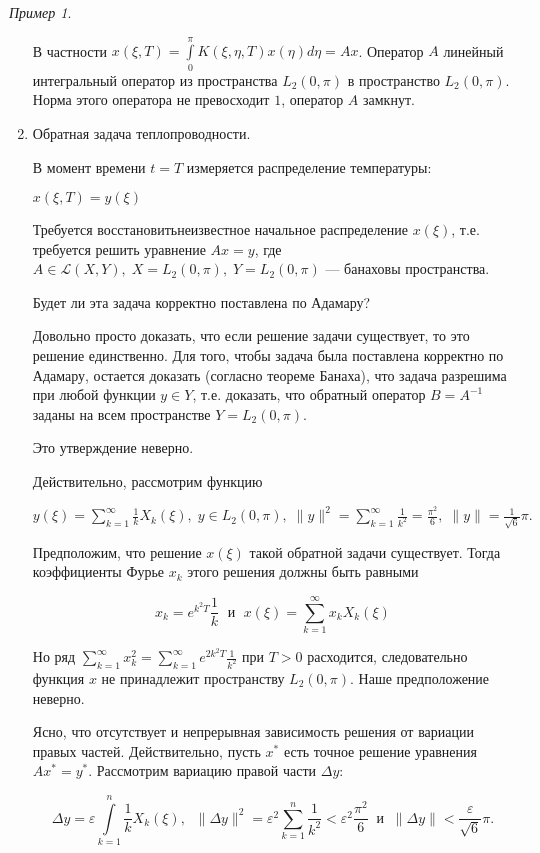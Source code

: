 \documentclass[12pt,a4paper,titlepage,oneside]{book}
\theoremstyle{definition}
\theoremstyle{plain}
\theoremstyle{break}
\theoremstyle{remark}
\theoremstyle{remark}
\newtheorem*{example}{Пример}
\theoremstyle{remark}
\theoremstyle{remark}
\theoremstyle{plain}
\theoremstyle{plain}
\begin{document}
\begin{example}
\begin{enumerate}
В частности $x(\xi,T) = \displaystyle\int\limits_0^\pi K(\xi, \eta, T) x(\eta)d\eta = Ax$. Оператор $A$ линейный интегральный оператор из пространства $L_2(0, \pi)$ в пространство $L_2(0, \pi)$. Норма этого оператора не превосходит $1$, оператор $A$ замкнут.

	\item Обратная задача теплопроводности.

В момент времени $t = T$ измеряется  распределение температуры:
\begin{center}
$x(\xi, T) = y(\xi)$
\end{center}

Требуется \guillemotleft восстановить\guillemotright \;неизвестное начальное распределение $x(\xi)$, т.е. требуется решить уравнение $Ax = y$, где $A \in \mathcal{L}(X,Y), \; X = L_{2}(0, \pi), \; Y = L_{2}(0, \pi)$ --- банаховы пространства.

Будет ли эта задача корректно поставлена по Адамару?

Довольно просто доказать, что если решение задачи существует, то это решение единственно. Для того, чтобы задача была поставлена корректно по Адамару, остается доказать (согласно теореме Банаха), что задача разрешима при любой функции $y \in Y$, т.е. доказать, что обратный оператор $B = A^{-1}$ заданы на всем пространстве $Y = L_{2}(0, \pi)$.

Это утверждение неверно.

Действительно, рассмотрим функцию
\begin{center}
$y(\xi)=\displaystyle\sum\limits_{k=1}^{\infty} \frac{1}{k} X_k(\xi) ,  \; y\in L_{2}(0, \pi), \; \|y\|^2 = \sum\limits_{k=1}^{\infty} \frac{1}{k^2} = \frac{\pi^2}{6} ,  \; \|y\| = \frac{1}{\sqrt{6}}\pi \mbox{.}$
\end{center}

Предположим, что решение $x(\xi)$ такой обратной задачи существует. Тогда коэффициенты Фурье $x_k$ этого решения должны быть равными

$$x_k=e^{k^2 T} \frac{1}{k} \; \mbox{ и } \; x(\xi) = \displaystyle\sum\limits_{k=1}^{\infty} x_k X_k(\xi)$$

Но ряд $\displaystyle\sum\limits_{k=1}^{\infty} x_k^2 = \sum\limits_{k=1}^{\infty} e^{2k^2 T} \frac{1}{k^2}$ при $T > 0$ расходится, следовательно функция $x$ не принадлежит пространству $L_2(0,\pi)$. Наше предположение неверно.

Ясно, что отсутствует и непрерывная зависимость решения от вариации правых частей. Действительно, пусть $x^{*}$ есть точное решение уравнения $Ax^*=y^*$. Рассмотрим вариацию правой части  $\Delta y$:
\begin{center}
$$\Delta y = \varepsilon \int\limits_{k=1}^{n} \frac{1}{k} X_k(\xi) , \; \; \| \Delta y\|^2 = \varepsilon ^2 \sum\limits_{k=1}^{n} \frac{1}{k^2} < \varepsilon^2 \frac{\pi ^2}{6} \; \; \mbox{и} \; \; \| \Delta y \| < \frac{\varepsilon}{\sqrt{6}}\pi.$$
\end{center}


\end{enumerate}
\end{example}
\end{document}
